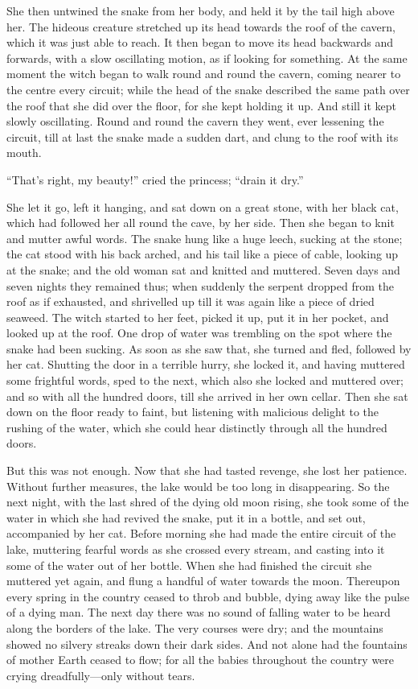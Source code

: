 \documentclass[12pt]{memoir}
\begin{document}
She then untwined the snake from her body, and held it by the tail
high above her.  The hideous creature stretched up its head towards
the roof of the cavern, which it was just able to reach.  It then
began to move its head backwards and forwards, with a slow oscillating
motion, as if looking for something.  At the same moment the witch
began to walk round and round the cavern, coming nearer to the centre
every circuit; while the head of the snake described the same path
over the roof that she did over the floor, for she kept holding it up.
And still it kept slowly oscillating.  Round and round the cavern they
went, ever lessening the circuit, till at last the snake made a sudden
dart, and clung to the roof with its mouth.

``That's right, my beauty!'' cried the princess; ``drain it dry.''

She let it go, left it hanging, and sat down on a great stone, with
her black cat, which had followed her all round the cave, by her side.
Then she began to knit and mutter awful words.  The snake hung like a
huge leech, sucking at the stone; the cat stood with his back arched,
and his tail like a piece of cable, looking up at the snake; and the
old woman sat and knitted and muttered.  Seven days and seven nights
they remained thus; when suddenly the serpent dropped from the roof as
if exhausted, and shrivelled up till it was again like a piece of
dried seaweed.  The witch started to her feet, picked it up, put it in
her pocket, and looked up at the roof.  One drop of water was
trembling on the spot where the snake had been sucking.  As soon as
she saw that, she turned and fled, followed by her cat.  Shutting the
door in a terrible hurry, she locked it, and having muttered some
frightful words, sped to the next, which also she locked and muttered
over; and so with all the hundred doors, till she arrived in her own
cellar.  Then she sat down on the floor ready to faint, but listening
with malicious delight to the rushing of the water, which she could
hear distinctly through all the hundred doors.

But this was not enough.  Now that she had tasted revenge, she lost
her patience.  Without further measures, the lake would be too long in
disappearing.  So the next night, with the last shred of the dying old
moon rising, she took some of the water in which she had revived the
snake, put it in a bottle, and set out, accompanied by her cat.
Before morning she had made the entire circuit of the lake, muttering
fearful words as she crossed every stream, and casting into it some of
the water out of her bottle.  When she had finished the circuit she
muttered yet again, and flung a handful of water towards the moon.
Thereupon every spring in the country ceased to throb and bubble,
dying away like the pulse of a dying man.  The next day there was no
sound of falling water to be heard along the borders of the lake.  The
very courses were dry; and the mountains showed no silvery streaks
down their dark sides.  And not alone had the fountains of mother
Earth ceased to flow; for all the babies throughout the country were
crying dreadfully---only without tears.
\end{document}
